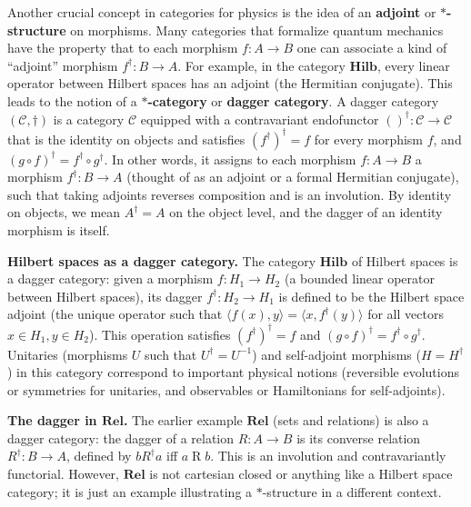 \vspace{1em}
Another crucial concept in categories for physics is the idea of an \textbf{adjoint} or \textbf{$*$-structure} on morphisms. Many categories that formalize quantum mechanics have the property that to each morphism $f: A \to B$ one can associate a kind of ``adjoint'' morphism $f^\dagger: B \to A$. For example, in the category $\mathbf{Hilb}$, every linear operator between Hilbert spaces has an adjoint (the Hermitian conjugate). This leads to the notion of a \textbf{$*$-category} or \textbf{dagger category}. A dagger category $(\mathcal{C}, \dagger)$ is a category $\mathcal{C}$ equipped with a contravariant endofunctor $()^\dagger: \mathcal{C} \to \mathcal{C}$ that is the identity on objects and satisfies $(f^\dagger)^\dagger = f$ for every morphism $f$, and $(g\circ f)^\dagger = f^\dagger \circ g^\dagger$. In other words, it assigns to each morphism $f: A \to B$ a morphism $f^\dagger: B \to A$ (thought of as an adjoint or a formal Hermitian conjugate), such that taking adjoints reverses composition and is an involution. By identity on objects, we mean $A^\dagger = A$ on the object level, and the dagger of an identity morphism is itself.

\vspace{1em}
\begin{example}\label{ex:Hilb-dagger}
\textbf{Hilbert spaces as a dagger category.} The category $\mathbf{Hilb}$ of Hilbert spaces is a dagger category: given a morphism $f: H_1 \to H_2$ (a bounded linear operator between Hilbert spaces), its dagger $f^\dagger: H_2 \to H_1$ is defined to be the Hilbert space adjoint (the unique operator such that $\langle f(x), y \rangle = \langle x, f^\dagger(y)\rangle$ for all vectors $x\in H_1, y\in H_2$). This operation satisfies $(f^\dagger)^\dagger = f$ and $(g\circ f)^\dagger = f^\dagger \circ g^\dagger$. Unitaries (morphisms $U$ such that $U^\dagger = U^{-1}$) and self-adjoint morphisms ($H=H^\dagger$) in this category correspond to important physical notions (reversible evolutions or symmetries for unitaries, and observables or Hamiltonians for self-adjoints).
\end{example}

\vspace{1em}
\begin{example}\label{ex:Rel-dagger}
\textbf{The dagger in $\mathbf{Rel}$.} The earlier example $\mathbf{Rel}$ (sets and relations) is also a dagger category: the dagger of a relation $R: A \to B$ is its converse relation $R^\dagger: B \to A$, defined by $b \mathrel{R^\dagger} a$ iff $a \mathrel{R} b$. This is an involution and contravariantly functorial. However, $\mathbf{Rel}$ is not cartesian closed or anything like a Hilbert space category; it is just an example illustrating a $*$-structure in a different context.
\end{example}

